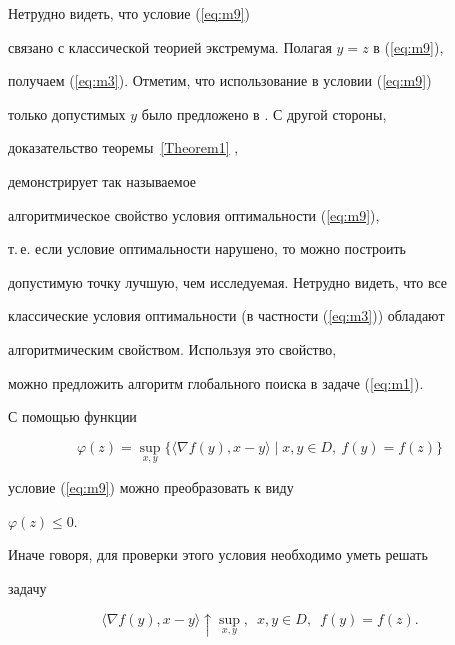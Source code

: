 \begin{note}


Нетрудно видеть, что условие (\ref{eq:m9})


связано с классической теорией экстремума. Полагая $y=z$ в (\ref{eq:m9}),


получаем (\ref{eq:m3}). Отметим, что использование в условии (\ref{eq:m9})


только допустимых $y$ было предложено в \cite{l8}. С другой стороны,


доказательство теоремы~\ref{Theorem1} \cite{l6}, \cite{l7}


демонстрирует так называемое


алгоритмическое свойство условия оптимальности (\ref{eq:m9}),


т.\,е. если условие оптимальности нарушено, то можно построить


допустимую точку лучшую, чем исследуемая. Нетрудно видеть, что все


классические условия оптимальности (в частности (\ref{eq:m3})) обладают


алгоритмическим свойством. Используя это свойство, 


можно предложить алгоритм глобального поиска в задаче (\ref{eq:m1}). 


\end{note}





С помощью функции


$$


\varphi (z)=\sup_{x,y}\{\langle \nabla f(y),x-y\rangle \mid


x,y \in D,\ f(y)=f(z)\}


$$


условие (\ref{eq:m9}) можно преобразовать \cite{l7} к виду


$\varphi (z) \leq 0$.


Иначе говоря, для проверки этого условия необходимо уметь решать


задачу


\begin{equation}


\langle \nabla f(y),x-y\rangle \uparrow \sup_{x,y},\ \;


x,y\in D,\ \; f(y)=f(z).


\label{eq:m11}


\end{equation}





